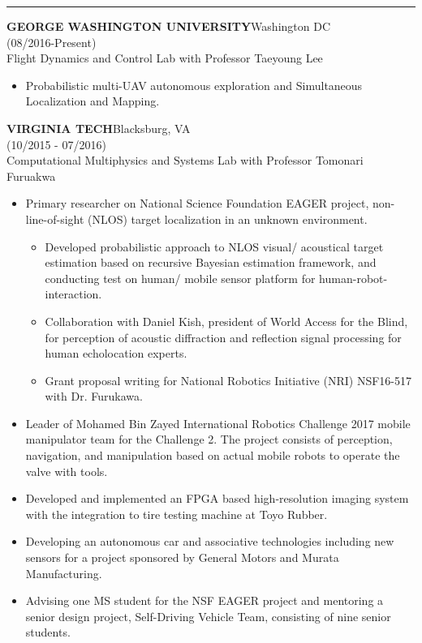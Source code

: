 \documentclass[11pt,letterpaper]{article}
\newcommand{\sect}[1]{\vspace{8mm}{\centering {\bf \large \scshape \uppercase{#1}} \par}  \vskip 2mm   {\color{blue} \hrule height 1pt}\vspace{2mm}}
\begin{document}
  \sect{appointments}
  \MakeUppercase{\bf George Washington University}\hfill{Washington DC}\\
  \hfill {(08/2016-Present)}\\
  Flight Dynamics and Control Lab with Professor Taeyoung Lee\\
  \begin{itemize}
    \item Probabilistic multi-UAV autonomous exploration and Simultaneous Localization and Mapping.
  \end{itemize}
  \MakeUppercase{\bf Virginia Tech}\hfill{Blacksburg, VA }\\
  \hfill {(10/2015 - 07/2016)}\\
  Computational Multiphysics and Systems Lab with Professor Tomonari Furuakwa\\
  \begin{itemize}
  	\item Primary researcher on National Science Foundation EAGER project, non-line-of-sight (NLOS) target localization in an unknown environment.
  	\begin{itemize}
  		\item Developed probabilistic approach to NLOS visual/ acoustical target estimation based on recursive Bayesian estimation framework, and conducting test on human/ mobile sensor platform for human-robot-interaction.
  		\item Collaboration with Daniel Kish, president of World Access for the Blind, for perception of acoustic diffraction and reflection signal processing for human echolocation experts.
  		\item Grant proposal writing for National Robotics Initiative (NRI) NSF16-517 with Dr. Furukawa.
  	\end{itemize}
  	\item Leader of Mohamed Bin Zayed International Robotics Challenge 2017 mobile manipulator team for the Challenge 2. The project consists of perception, navigation, and manipulation based on actual mobile robots to operate the valve with tools.
  	\item Developed and implemented an FPGA based high-resolution imaging system with the integration to tire testing machine at Toyo Rubber.
  	\item Developing an autonomous car and associative technologies including new sensors for a project sponsored by General Motors and Murata Manufacturing. \item Advising one MS student for the NSF EAGER project and mentoring a senior design project, Self-Driving Vehicle Team, consisting of nine senior students.
  \end{itemize}
\end{document}
